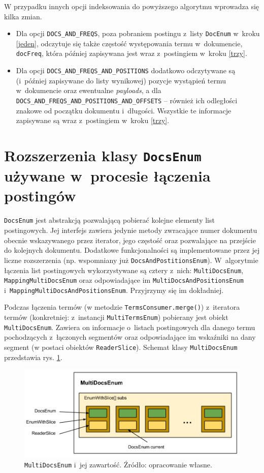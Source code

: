 W przypadku innych opcji indeksowania do powyższego algorytmu wprowadza się kilka zmian.
\begin{itemize}
 \item Dla opcji \texttt{DOCS\_AND\_FREQS}, poza pobraniem postingu z~listy \texttt{DocEnum} w~kroku \ref{jeden}, odczytuje się także częstość występowania termu w~dokumencie, \texttt{docFreq}, która później zapisywana jest wraz z~postingiem w~kroku \ref{trzy}.
 \item Dla opcji \texttt{DOCS\_AND\_FREQS\_AND\_POSITIONS} dodatkowo odczytywane są (i~później zapisywane do listy wynikowej) pozycje wystąpień termu w~dokumencie oraz ewentualne \emph{payloads}, a dla \texttt{DOCS\_AND\_FREQS\_AND\_POSITIONS\_AND\_OFFSETS} -- również ich odległości znakowe od początku dokumentu i~długości. Wszystkie te informacje zapisywane są wraz z~postingiem w~kroku \ref{trzy}.
\end{itemize}

\section{Rozszerzenia klasy \texttt{DocsEnum} używane w~procesie łączenia postingów}

\texttt{DocsEnum} jest abstrakcją pozwalającą pobierać kolejne elementy list postingowych. Jej interfejs zawiera jedynie metody zwracające numer dokumentu obecnie wskazywanego przez iterator, jego częstość oraz pozwalające na przejście do kolejnych dokumentu. Dodatkowe funkcjonalności są implementowane przez jej liczne rozszerzenia (np. wspomniany już \texttt{DocsAndPostitionsEnum}). W~algorytmie łączenia list postingowych wykorzystywane są cztery z~nich: \texttt{MultiDocsEnum}, \texttt{MappingMultiDocsEnum} oraz odpowiadające im \texttt{MultiDocsAndPositionsEnum} i~\texttt{MappingMultiDocsAndPositionsEnum}. Przyjrzymy się im dokładniej.

Podczas łączenia termów (w metodzie \texttt{TermsConsumer.merge()}) z~iteratora termów (konkretniej: z~instancji \texttt{MultiTermsEnum}) pobierany jest obiekt \texttt{MultiDocsEnum}. Zawiera on informacje o~listach postingowych dla danego termu pochodzących z~łączonych segmentów oraz odpowiadające im wskaźniki na dany segment (w postaci obiektów \texttt{ReaderSlice}). Schemat klasy \texttt{MultiDocsEnum} przedstawia rys. \ref{fig:multiDocsEnum}.

\begin{figure}[here]
 \includegraphics[scale=0.4]{pictures/MultiDocsEnum.png}
 \caption{\texttt{MultiDocsEnum} i~jej zawartość. Źródło: opracowanie własne. \label{fig:multiDocsEnum}}
\end{figure}

